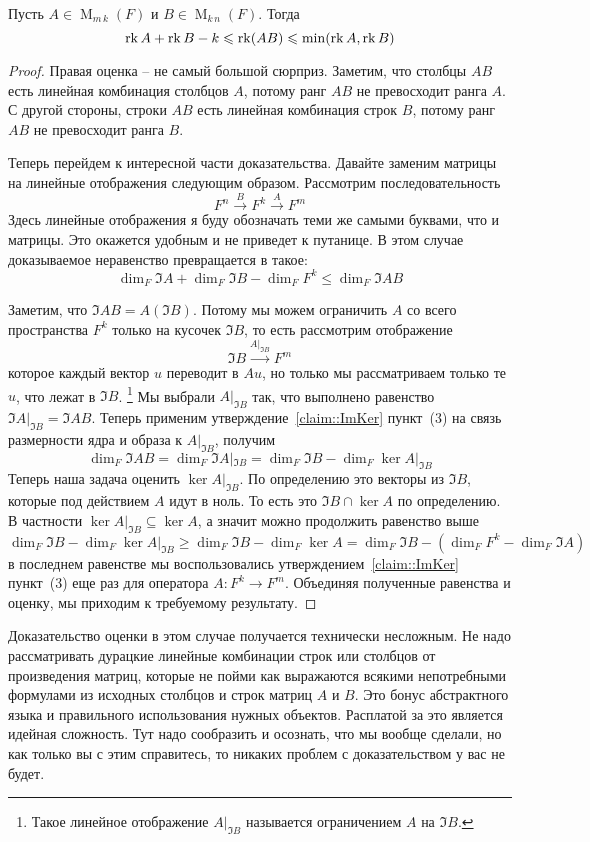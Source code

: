 \begin{claim}
Пусть $A\in \operatorname{M}_{m\,k}(F)$ и $B\in\operatorname{M}_{k\,n}(F)$.
Тогда
\[
\operatorname{rk} A +\operatorname{rk} B - k \leqslant \operatorname{rk} (AB )\leqslant \min(\operatorname{rk} A, \operatorname{rk} B)
\]
\end{claim}
\begin{proof}
Правая оценка -- не самый большой сюрприз.
Заметим, что столбцы $AB$ есть линейная комбинация столбцов $A$, потому ранг $AB$ не превосходит ранга $A$.
С другой стороны, строки $AB$ есть линейная комбинация строк $B$, потому ранг $AB$ не превосходит ранга $B$.

Теперь перейдем к интересной части доказательства.
Давайте заменим матрицы на линейные отображения следующим образом.
Рассмотрим последовательность 
\[
F^n \stackrel{B}{\longrightarrow} F^k \stackrel{A}{\longrightarrow} F^m
\]
Здесь линейные отображения я буду обозначать теми же самыми буквами, что и матрицы.
Это окажется удобным и не приведет к путанице.
В этом случае доказываемое неравенство превращается в такое:
\[
\dim_F \Im A + \dim_F \Im B - \dim_F F^k \leqslant \dim_F\Im AB
\]

Заметим, что $\Im AB = A(\Im B)$.
Потому мы можем ограничить $A$ со всего пространства $F^k$ только на кусочек $\Im B$, то есть рассмотрим отображение
\[
\Im B \stackrel{A|_{\Im B}}{\longrightarrow} F^m
\]
которое каждый вектор $u$ переводит в $Au$, но только мы рассматриваем только те $u$, что лежат в $\Im B$.%
\footnote{Такое линейное отображение $A|_{\Im B}$ называется ограничением $A$ на $\Im B$.}
Мы выбрали $A|_{\Im B}$ так, что выполнено равенство $\Im A|_{\Im B} = \Im AB$.
Теперь применим утверждение~\ref{claim::ImKer} пункт~(3) на связь размерности ядра и образа к $A|_{\Im B}$, получим
\[
\dim_F \Im AB = \dim_F \Im A|_{\Im B} = \dim_F \Im B - \dim_F \ker A|_{\Im B}
\]
Теперь наша задача оценить $\ker A|_{\Im B}$.
По определению это векторы из $\Im B$, которые под действием $A$ идут в ноль.
То есть это $\Im B \cap \ker A$ по определению.
В частности $\ker A|_{\Im B}\subseteq \ker A$, а значит можно продолжить равенство выше
\[
\dim_F \Im B - \dim_F \ker A|_{\Im B}\geqslant \dim_F \Im B - \dim_F \ker A = \dim_F \Im B - (\dim_F F^k - \dim_F \Im A)
\]
в последнем равенстве мы воспользовались утверждением~\ref{claim::ImKer} пункт~(3) еще раз для оператора $A\colon F^k \to F^m$.
Объединяя полученные равенства и оценку, мы приходим к требуемому результату.
\end{proof}

Доказательство оценки в этом случае получается технически несложным.
Не надо рассматривать дурацкие линейные комбинации строк или столбцов от произведения матриц, которые не пойми как выражаются всякими непотребными формулами из исходных столбцов и строк матриц $A$ и $B$.
Это бонус абстрактного языка и правильного использования нужных объектов.
Расплатой за это является идейная сложность.
Тут надо сообразить и осознать, что мы вообще сделали, но как только вы с этим справитесь, то никаких проблем с доказательством у вас не будет.


